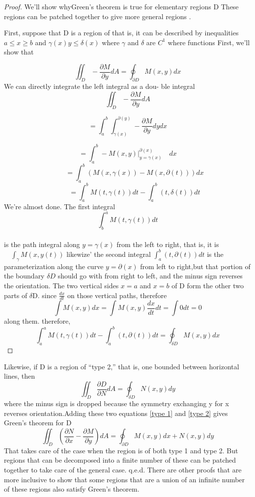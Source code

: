 \documentclass[10pt,a4paper]{article}
\newtheorem{proof}[theorem]{proof}
\begin{document}
\begin{proof}
We’ll show whyGreen’s theorem is true for elementary regions D These regions can be patched together to give more general regions \cite{ref1}.

First, suppose that D is a region of  that is, it can be described by inequalities ${a}\leq{x}\geq{b}$ and $\gamma\left(x\right){y}\leq\delta\left(x\right)$ where $\gamma$ and $\delta$ are $C^{1}$ where functions First, we’ll show that	
	
$$\iint_{D}-\frac{\partial M}{\partial y}dA=\oint_{\partial D}M\left(x,y\right)dx$$
We can directly integrate the left integral as a dou-
ble integral
$$\iint_{D}-\frac{\partial M}{\partial y}dA$$

$$=\int_{a}^{b}\int_{\gamma\left(x\right)}^{\partial \left(y\right)} -\frac{\partial M}{\partial y}dydx$$

$$=\int_{a}^{b}-M\left(x,y\right)\lvert_{y=\gamma\left(x\right)}^{\partial\left(x\right)}\quad dx$$
$$\quad\quad=\int_{a}^{b}\left(M\left(x,\gamma\left(x\right)\right)-M\left(x,\partial\left(t\right)\right)\right)dx$$
$$\quad\quad=\int_{a}^{b}M\left(t, \gamma\left(t\right)\right)dt-\int_{a}^{b}\left(t,\delta\left(t\right)\right)dt$$	
We’re almost done. The first integral
$$\int_{b}^{a}M\left(t,\gamma\left(t\right)\right)dt$$\\
is the path integral along $y=\gamma\left(x\right)$ from the left to right, that is, it is $\quad\int_{\gamma} 
M\left(x,y\left(t\right)\right)$ likewize' the second integral $\int_{a}^{b}\left(t,\partial\left(t\right)\right)dt$ is the parameterization along the curve $y=\partial\left(x\right)$ from left to right,but that 
portion of the boundary $\delta D$ should go with from right to left, and the minus sign reverses the 
orientation. The two vertical sides $x=a$ and $x=b$ of D form the other two parts of $\delta$D. since $\frac{dx}{dt}$  on those vertical paths, therefore\\
$$\int M\left(x,y\right)dx=\int M\left(x,y\right)\frac{dx}{dt}dt= \int0dt=0$$
along them. therefore,
$$\int_{a}^{a} M\left(t,\gamma\left(t\right)\right)dt-\int_{a}^{b}\left(t,\partial\left(t\right)\right)dt=\oint_{\delta D}M\left(x,y\right)dx$$\label{type 1}

\end{proof}
 

Likewise, if D is a region of “type 2,” that is, one bounded between horizontal lines, then\\
$$\iint_{D}\frac{\partial D}{\partial N} dA=\oint_{\delta D} N\left(x,y\right)dy$$\label{type 2}
where the minus sign is dropped because the symmetry exchanging y for x reverses orientation.Adding these two equations \ref{type 1} and \ref{type 2} gives Green’s theorem for D
$$\iint_{D}\left(\frac{\partial N}{\partial x}-\frac{\partial M}{\partial y}\right)dA=\oint_{\partial D}M\left(x,y\right)dx+ N\left(x,y\right)dy$$
That takes care of the case when the region is of
both type 1 and type 2. But regions that can be
decomposed into a finite number of these can be
patched together to take care of the general case.
q.e.d.\cite{ref1}
There are other proofs that are more inclusive
to show that some regions that are a union of an
infinite number of these regions also satisfy Green’s 
theorem.





	
\end{document}
